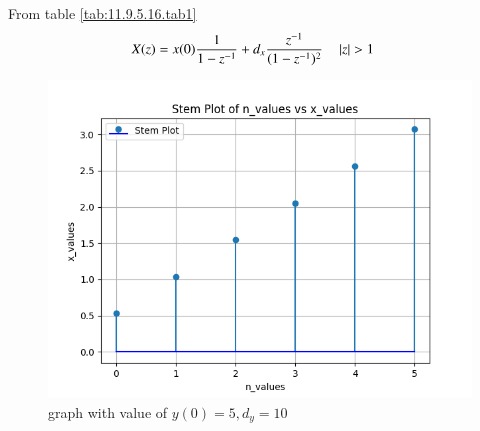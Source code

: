 \documentclass[journal,12pt,onecolumn]{IEEEtran}
\theoremstyle{remark}
\begin{document}

From table \ref{tab:11.9.5.16.tab1}
\begin{align}
X(z) &= x(0)\frac{1}{1- z^{-1}} + d_x\frac{z^{-1}}{(1-z^{-1})^2} \quad \left\vert z\right\vert > 1
\end{align}

\begin{figure}[h]
    \centering
    \includegraphics[width=\columnwidth]{./figs/fig1.png}
    \caption{graph with value of $y(0) = 5, d_y = 10$ }
\end{figure}
\end{document}
